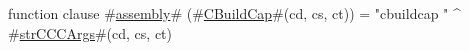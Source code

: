 function clause #\hyperref[sailMIPSzassembly]{assembly}# (#\hyperref[sailMIPSzCBuildCap]{CBuildCap}#(cd, cs, ct)) = "cbuildcap " ^ #\hyperref[sailMIPSzstrCCCArgs]{strCCCArgs}#(cd, cs, ct)
